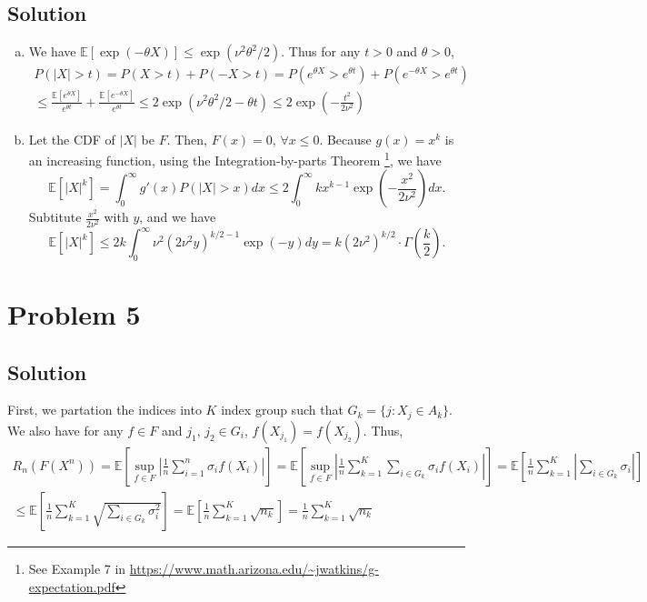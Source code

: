 \documentclass[11pt]{report}
\newcommand{\E}[1]{\mathbb{E}\left[#1\right]}
\begin{document}
\subsection*{Solution}
\begin{enumerate}[(a)]
  \item
  We have $\E{\exp(-\theta X)} \leq \exp(\nu^2\theta^2/2)$. Thus for any $t > 0$ and $\theta > 0$,
  \begin{multline*}
    P(|X| > t) = P(X > t) + P(-X > t) = P(e^{\theta X} > e^{\theta t}) + P(e^{-\theta X} > e^{\theta t}) \\\leq \frac{\E{e^{\theta X}}}{e^{\theta t}} + \frac{\E{e^{-\theta X}}}{e^{\theta t}} \leq 2 \exp(\nu^2\theta^2/2  - \theta t) \leq 2 \exp(-\frac{t^2}{2 \nu^2})
  \end{multline*}
  \item Let the CDF of $|X|$ be $F$. Then, $F(x) = 0$, $\forall x \leq 0$. Because $g(x) = x^k$ is an increasing function, using the Integration-by-parts Theorem \footnote{See Example 7 in \url{https://www.math.arizona.edu/~jwatkins/g-expectation.pdf}}, we have $$\E{|X|^k} = \int_{0}^{\infty} g'(x) P(|X|>x) dx \leq 2 \int_{0}^{\infty} kx^{k-1} \exp(-\frac{x^2}{2 \nu^2}) dx.$$ Subtitute $\frac{x^2}{2 \nu^2}$ with $y$, and we have $$\E{|X|^k} \leq 2 k \int_{0}^{\infty} \nu^2 (2 \nu^2 y)^{k/2-1} \exp(-y) dy = k (2\nu^2)^{k/2} \cdot \Gamma(\frac{k}{2}).$$
\end{enumerate}
\section*{Problem 5}
\subsection*{Solution}
First, we partation the indices into $K$ index group such that $G_k = \{j: X_j \in A_k\}$. We also have for any $f \in F$ and $j_1,\,j_2 \in G_i$, $f(X_{j_1}) = f(X_{j_2})$. Thus,
\begin{multline*}
  R_n(F(X^n)) = \E{\sup\limits_{f \in F} \left|\frac{1}{n}\sum_{i=1}^{n}\sigma_i f(X_i)\right|} = \E{\sup\limits_{f \in F} \left|\frac{1}{n}\sum_{k=1}^{K} \sum_{i \in G_k} \sigma_i f(X_i)\right|} = \E{\frac{1}{n}\sum_{k=1}^{K} \left|\sum_{i \in G_k} \sigma_i\right|} \\\leq \E{\frac{1}{n}\sum_{k=1}^{K} \sqrt{\sum_{i \in G_k} \sigma_i^2}} = \E{\frac{1}{n}\sum_{k=1}^{K} \sqrt{n_k}} = \frac{1}{n}\sum_{k=1}^{K} \sqrt{n_k}
\end{multline*}
\end{document}
